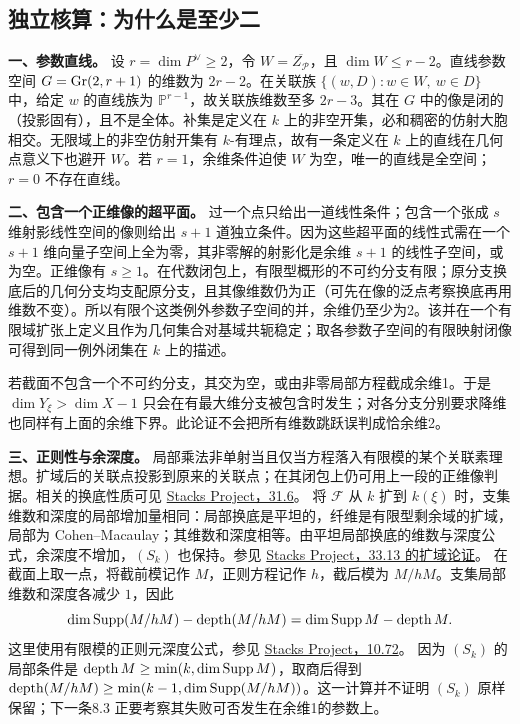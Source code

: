 \subsection*{独立核算：为什么是至少二}
\textbf{一、参数直线。}
设 $r=\dim P^\vee\ge2$，令 $W=\overline{Z_{\mathcal P}}$，且 $\dim W\le r-2$。直线参数空间 $G=\operatorname{Gr}(2,r+1)$ 的维数为 $2r-2$。在关联族 $\{(w,D):w\in W,\ w\in D\}$ 中，给定 $w$ 的直线族为 $\mathbb P^{r-1}$，故关联族维数至多 $2r-3$。其在 $G$ 中的像是闭的（投影固有），且不是全体。补集是定义在 $k$ 上的非空开集，必和稠密的仿射大胞相交。无限域上的非空仿射开集有 $k$-有理点，故有一条定义在 $k$ 上的直线在几何点意义下也避开 $W$。若 $r=1$，余维条件迫使 $W$ 为空，唯一的直线是全空间；$r=0$ 不存在直线。

\textbf{二、包含一个正维像的超平面。}
过一个点只给出一道线性条件；包含一个张成 $s$ 维射影线性空间的像则给出 $s+1$ 道独立条件。因为这些超平面的线性式需在一个 $s+1$ 维向量子空间上全为零，其非零解的射影化是余维 $s+1$ 的线性子空间，或为空。正维像有 $s\ge1$。在代数闭包上，有限型概形的不可约分支有限；原分支换底后的几何分支均支配原分支，且其像维数仍为正（可先在像的泛点考察换底再用维数不变）。所以有限个这类例外参数子空间的并，余维仍至少为2。该并在一个有限域扩张上定义且作为几何集合对基域共轭稳定；取各参数子空间的有限映射闭像可得到同一例外闭集在 $k$ 上的描述。

若截面不包含一个不可约分支，其交为空，或由非零局部方程截成余维1。于是 $\dim Y_\xi>\dim X-1$ 只会在有最大维分支被包含时发生；对各分支分别要求降维也同样有上面的余维下界。此论证不会把所有维数跳跃误判成恰余维2。


\textbf{三、正则性与余深度。}
局部乘法非单射当且仅当方程落入有限模的某个关联素理想。扩域后的关联点投影到原来的关联点；在其闭包上仍可用上一段的正维像判据。相关的换底性质可见
\href{https://stacks.math.columbia.edu/tag/05EW}{Stacks Project，31.6}。
将 $\mathcal F$ 从 $k$ 扩到 $k(\xi)$ 时，支集维数和深度的局部增加量相同：局部换底是平坦的，纤维是有限型剩余域的扩域，局部为 Cohen--Macaulay；其维数和深度相等。由平坦局部换底的维数与深度公式，余深度不增加，$(S_k)$ 也保持。参见
\href{https://stacks.math.columbia.edu/tag/045O}{Stacks Project，33.13 的扩域论证}。
在截面上取一点，将截前模记作 $M$，正则方程记作 $h$，截后模为 $M/hM$。支集局部维数和深度各减少 $1$，因此
\[
 \dim\operatorname{Supp}(M/hM)-\operatorname{depth}(M/hM)=\dim\operatorname{Supp} M-\operatorname{depth} M.
\]
这里使用有限模的正则元深度公式，参见
\href{https://stacks.math.columbia.edu/tag/00LE}{Stacks Project，10.72}。
因为 $(S_k)$ 的局部条件是 $\operatorname{depth} M\ge\min(k,\dim\operatorname{Supp} M)$，取商后得到 $\operatorname{depth}(M/hM)\ge\min(k-1,\dim\operatorname{Supp}(M/hM))$。这一计算并不证明 $(S_k)$ 原样保留；下一条8.3 正要考察其失败可否发生在余维1的参数上。

